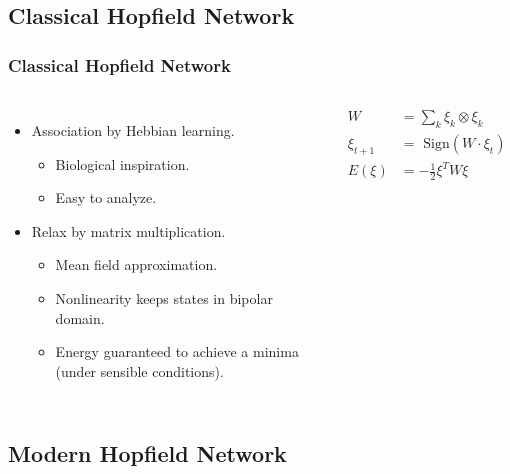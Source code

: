 
\subsection{Classical Hopfield Network} 

\begin{frame}
	
    \frametitle{Classical Hopfield Network}
    \begin{columns}[c]
        \begin{itemize}
            \item Association by Hebbian learning.
            \begin{itemize}
                \item Biological inspiration.
                \item Easy to analyze.
            \end{itemize}
            \item Relax by matrix multiplication.
            \begin{itemize}
                \item Mean field approximation.
                \item Nonlinearity keeps states in bipolar domain.
                \item Energy guaranteed to achieve a minima (under sensible conditions).
            \end{itemize}
        \end{itemize}

        \begin{align}
            W &= \sum_{k} \xi_k \otimes \xi_k \\
            \xi_{t+1} &= \text{ Sign}\left( W \cdot \xi_{t} \right) \\
            E \left( \xi \right) &= -\frac{1}{2} \xi^T W \xi
        \end{align}
    \end{columns}
\end{frame}


\subsection{Modern Hopfield Network} 

